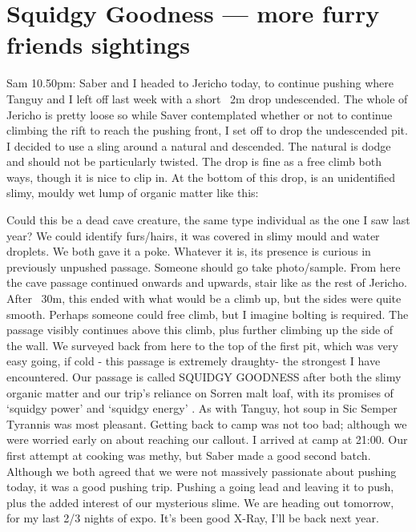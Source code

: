 \section{Squidgy Goodness --- more furry friends sightings}
\begin{marginfigure}
\end{marginfigure}


Sam 10.50pm: Saber and I headed to Jericho today, to continue pushing where Tanguy and I left off last week with a short ~2m drop undescended. The whole of Jericho is pretty loose so while Saver contemplated whether or not to continue climbing the rift to reach the pushing front, I set off to drop the undescended pit.
I decided to use a sling around a natural and descended. The natural is dodge and should not be particularly twisted. The drop is fine as a free climb both ways, though it is nice to clip in. At the bottom of this drop, is an unidentified slimy, mouldy wet lump of organic matter like this: 

Could this be a dead cave creature, the same type individual as the one I saw last year?
We could identify furs/hairs, it was covered in slimy mould and water droplets. We both gave it a poke. Whatever it is, its presence is curious in previously unpushed passage. Someone should go take photo/sample.
From here the cave passage continued onwards and upwards, stair like as the rest of Jericho. After ~30m, this ended with what would be a climb up, but the sides were quite smooth. Perhaps someone could free climb, but I imagine bolting is required. The passage visibly continues above this climb, plus further climbing up the side of the wall. We surveyed back from here to  the top of the first pit, which was very easy going, if cold  - this passage is extremely draughty- the strongest I have encountered. Our passage is called SQUIDGY GOODNESS after both the slimy organic matter and our trip’s reliance on Sorren malt loaf, with its promises of ‘squidgy power’ and ‘squidgy energy’ . As with Tanguy, hot soup in Sic Semper Tyrannis was most pleasant.
Getting back to camp was not too bad; although we were worried early on about reaching our callout. I arrived at camp at 21:00. Our first attempt at cooking was methy, but Saber made a good second batch. Although we both agreed that we were not massively passionate about pushing today, it was a good pushing trip. Pushing a going lead and leaving it to push, plus the added interest of our mysterious slime.
We are heading out tomorrow, for my last 2/3 nights of expo. It’s been good X-Ray, I’ll be back next year.

